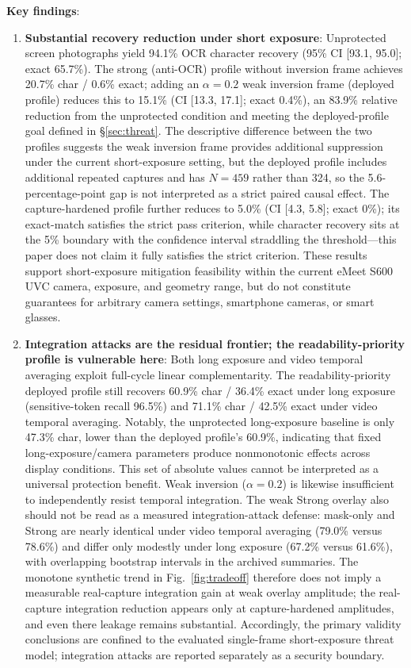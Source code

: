 \documentclass{ieeeaccess}
\begin{document}
\textbf{Key findings}:

\begin{enumerate}
\item \textbf{Substantial recovery reduction under short exposure}: Unprotected screen photographs yield 94.1\% OCR character recovery (95\% CI [93.1, 95.0]; exact 65.7\%). The strong (anti-OCR) profile without inversion frame achieves 20.7\% char / 0.6\% exact; adding an $\alpha=0.2$ weak inversion frame (deployed profile) reduces this to 15.1\% (CI [13.3, 17.1]; exact 0.4\%), an 83.9\% relative reduction from the unprotected condition and meeting the deployed-profile goal defined in \S\ref{sec:threat}. The descriptive difference between the two profiles suggests the weak inversion frame provides additional suppression under the current short-exposure setting, but the deployed profile includes additional repeated captures and has $N=459$ rather than 324, so the 5.6-percentage-point gap is not interpreted as a strict paired causal effect. The capture-hardened profile further reduces to 5.0\% (CI [4.3, 5.8]; exact 0\%); its exact-match satisfies the strict pass criterion, while character recovery sits at the 5\% boundary with the confidence interval straddling the threshold---this paper does not claim it fully satisfies the strict criterion. These results support short-exposure mitigation feasibility within the current eMeet S600 UVC camera, exposure, and geometry range, but do not constitute guarantees for arbitrary camera settings, smartphone cameras, or smart glasses.

\item \textbf{Integration attacks are the residual frontier; the readability-priority profile is vulnerable here}: Both long exposure and video temporal averaging exploit full-cycle linear complementarity. The readability-priority deployed profile still recovers 60.9\% char / 36.4\% exact under long exposure (sensitive-token recall 96.5\%) and 71.1\% char / 42.5\% exact under video temporal averaging. Notably, the unprotected long-exposure baseline is only 47.3\% char, lower than the deployed profile's 60.9\%, indicating that fixed long-exposure/camera parameters produce nonmonotonic effects across display conditions. This set of absolute values cannot be interpreted as a universal protection benefit. Weak inversion ($\alpha=0.2$) is likewise insufficient to independently resist temporal integration. The weak Strong overlay also should not be read as a measured integration-attack defense: mask-only and Strong are nearly identical under video temporal averaging (79.0\% versus 78.6\%) and differ only modestly under long exposure (67.2\% versus 61.6\%), with overlapping bootstrap intervals in the archived summaries. The monotone synthetic trend in Fig.~\ref{fig:tradeoff} therefore does not imply a measurable real-capture integration gain at weak overlay amplitude; the real-capture integration reduction appears only at capture-hardened amplitudes, and even there leakage remains substantial. Accordingly, the primary validity conclusions are confined to the evaluated single-frame short-exposure threat model; integration attacks are reported separately as a security boundary.


\end{enumerate}
\end{document}
